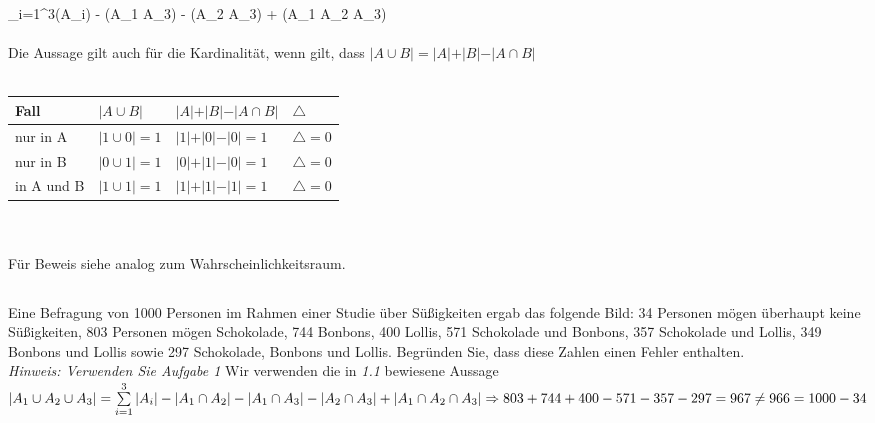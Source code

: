 \documentclass[a4paper]{article}
\begin{document}
\Rightarrow \sum\limits_{i=1}^3(A_i) - (A_1 \cap A_3) - (A_2 \cap A_3) + (A_1 \cup A_2 \cap A_3)\)\\\\
Die Aussage gilt auch für die Kardinalität, wenn gilt, dass $\vert A \cup B\vert = \vert A \vert + \vert B \vert - \vert A \cap B \vert$\\\\
\begin{tabular}{|l|l|l|l|}
    \hline
    Fall & $\vert A \cup B \vert$ & $\vert A \vert + \vert B \vert - \vert A \cap B \vert$ & $\triangle$\\
    \hline
    nur in A & $\vert 1 \cup 0 \vert = 1$ & $\vert 1 \vert + \vert 0 \vert - \vert 0 \vert = 1$ & $\triangle=0$\\
    \hline 
    nur in B & $\vert 0 \cup 1 \vert = 1$ & $\vert 0 \vert + \vert 1 \vert - \vert 0 \vert = 1$ & $\triangle=0$\\
    \hline in A und B & $\vert 1 \cup 1 \vert = 1$ & $\vert 1 \vert + \vert 1 \vert - \vert 1 \vert = 1$ & $\triangle=0$\\
    \hline 
\end{tabular}\\\\
Für Beweis siehe analog zum Wahrscheinlichkeitsraum.
\clearpage
\subsection{}
Eine Befragung von 1000 Personen im Rahmen einer Studie über Süßigkeiten ergab das folgende
Bild: 34 Personen mögen überhaupt keine Süßigkeiten, 803 Personen mögen Schokolade, 744
Bonbons, 400 Lollis, 571 Schokolade und Bonbons, 357 Schokolade und Lollis, 349 Bonbons und
Lollis sowie 297 Schokolade, Bonbons und Lollis. Begründen Sie, dass diese Zahlen einen Fehler
enthalten.\\
\textit{Hinweis: Verwenden Sie Aufgabe 1}
Wir verwenden die in \textit{1.1} bewiesene Aussage\\ 
\(|A_1 \cup A_2 \cup A_3| = \sum\limits_{i=1}^{3} |A_i| - |A_1 \cap A_2| - |A_1 \cap A_3| - |A_2 \cap A_3| + |A_1 \cap A_2 \cap A_3|\\
\Rightarrow 803 + 744 + 400 - 571 - 357 - 297 = 967 \neq 966 = 1000-34\)
\end{document}
